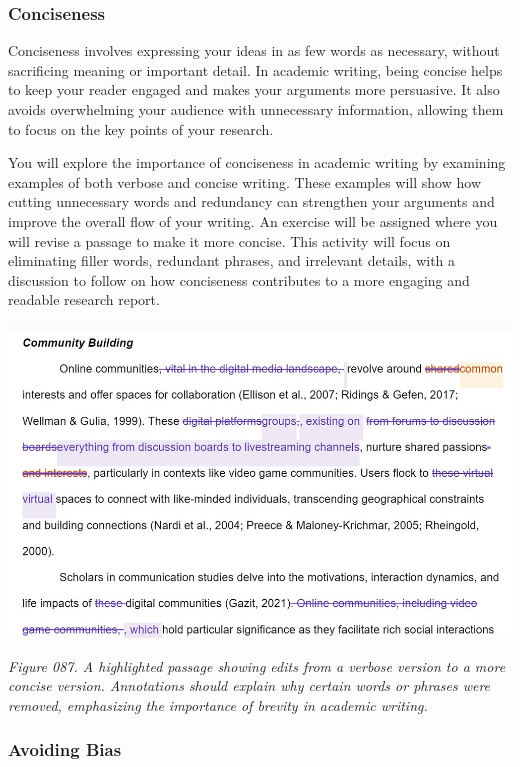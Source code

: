 \documentclass[
]{book}
\begin{document}
\subsubsection{Conciseness}\label{conciseness}

Conciseness involves expressing your ideas in as few words as necessary, without sacrificing meaning or important detail. In academic writing, being concise helps to keep your reader engaged and makes your arguments more persuasive. It also avoids overwhelming your audience with unnecessary information, allowing them to focus on the key points of your research.

You will explore the importance of conciseness in academic writing by examining examples of both verbose and concise writing. These examples will show how cutting unnecessary words and redundancy can strengthen your arguments and improve the overall flow of your writing. An exercise will be assigned where you will revise a passage to make it more concise. This activity will focus on eliminating filler words, redundant phrases, and irrelevant details, with a discussion to follow on how conciseness contributes to a more engaging and readable research report.

\includegraphics[width=1\textwidth,height=\textheight]{images/fig087.jpg}

\emph{Figure 087. A highlighted passage showing edits from a verbose version to a more concise version. Annotations should explain why certain words or phrases were removed, emphasizing the importance of brevity in academic writing.}

\subsubsection{Avoiding Bias}\label{avoiding-bias}
\end{document}
